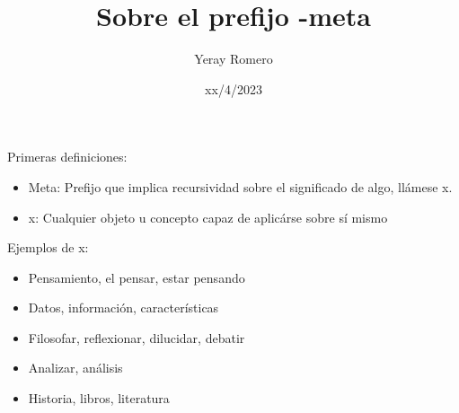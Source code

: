\title{Sobre el prefijo -meta}
\date{xx/4/2023}
\author{Yeray Romero}



    \maketitle
    
    Primeras definiciones: 
    \begin{itemize}
    \item Meta: Prefijo que implica recursividad sobre el significado de algo, llámese x.
    \item x: Cualquier objeto u concepto capaz de aplicárse sobre sí mismo
    \end{itemize}
    Ejemplos de x:
    \begin{itemize}
    \item Pensamiento, el pensar, estar pensando
    \item Datos, información, características
    \item Filosofar, reflexionar, dilucidar, debatir
    \item Analizar, análisis
    \item Historia, libros, literatura
    \end{itemize}


